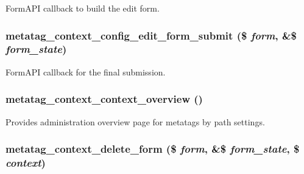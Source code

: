\label{metatag__context_8admin_8inc_aa80895a6822f4e8be8026ddb35d2c2fa}
FormAPI callback to build the edit form. \hypertarget{metatag__context_8admin_8inc_a5ab3d7c9c5d45ae4099922d89536caaa}{
\subsubsection[{metatag\_\-context\_\-config\_\-edit\_\-form\_\-submit}]{\setlength{\rightskip}{0pt plus 5cm}metatag\_\-context\_\-config\_\-edit\_\-form\_\-submit (\$ {\em form}, \/  \&\$ {\em form\_\-state})}}
\label{metatag__context_8admin_8inc_a5ab3d7c9c5d45ae4099922d89536caaa}
FormAPI callback for the final submission. \hypertarget{metatag__context_8admin_8inc_a8f131db71f23b23936394c1d4638a293}{
\subsubsection[{metatag\_\-context\_\-context\_\-overview}]{\setlength{\rightskip}{0pt plus 5cm}metatag\_\-context\_\-context\_\-overview ()}}
\label{metatag__context_8admin_8inc_a8f131db71f23b23936394c1d4638a293}
Provides administration overview page for metatags by path settings. \hypertarget{metatag__context_8admin_8inc_a905543e7688e10eabe222fbd44ca9d16}{
\subsubsection[{metatag\_\-context\_\-delete\_\-form}]{\setlength{\rightskip}{0pt plus 5cm}metatag\_\-context\_\-delete\_\-form (\$ {\em form}, \/  \&\$ {\em form\_\-state}, \/  \$ {\em context})}}
\label{metatag__context_8admin_8inc_a905543e7688e10eabe222fbd44ca9d16}
